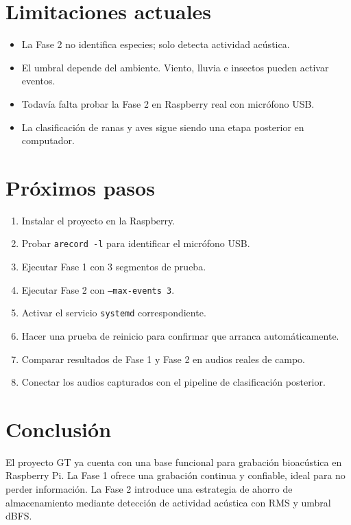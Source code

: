 \documentclass[11pt,letterpaper]{article}
\newcommand{\archivo}[1]{\texttt{#1}}
\begin{document}
\section{Limitaciones actuales}

\begin{itemize}[leftmargin=*]
  \item La Fase 2 no identifica especies; solo detecta actividad acústica.
  \item El umbral depende del ambiente. Viento, lluvia e insectos pueden activar eventos.
  \item Todavía falta probar la Fase 2 en Raspberry real con micrófono USB.
  \item La clasificación de ranas y aves sigue siendo una etapa posterior en computador.
\end{itemize}

\section{Próximos pasos}

\begin{enumerate}[leftmargin=*]
  \item Instalar el proyecto en la Raspberry.
  \item Probar \archivo{arecord -l} para identificar el micrófono USB.
  \item Ejecutar Fase 1 con 3 segmentos de prueba.
  \item Ejecutar Fase 2 con \archivo{--max-events 3}.
  \item Activar el servicio \archivo{systemd} correspondiente.
  \item Hacer una prueba de reinicio para confirmar que arranca automáticamente.
  \item Comparar resultados de Fase 1 y Fase 2 en audios reales de campo.
  \item Conectar los audios capturados con el pipeline de clasificación posterior.
\end{enumerate}

\section{Conclusión}

El proyecto GT ya cuenta con una base funcional para grabación bioacústica en Raspberry Pi. La Fase 1 ofrece una grabación continua y confiable, ideal para no perder información. La Fase 2 introduce una estrategia de ahorro de almacenamiento mediante detección de actividad acústica con RMS y umbral dBFS.
\end{document}

